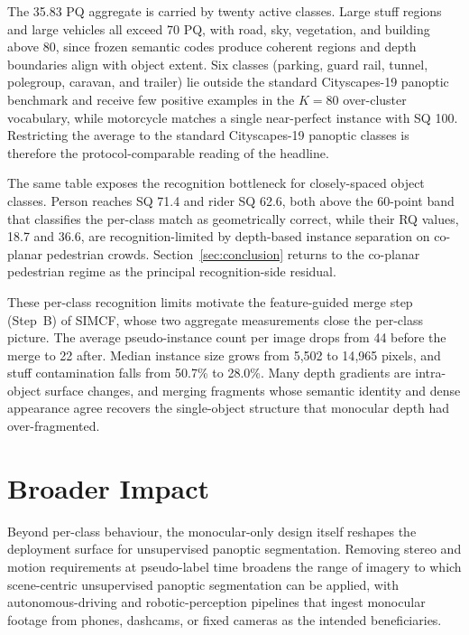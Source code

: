 \documentclass{article}
\begin{document}
The 35.83 PQ aggregate is carried by twenty active classes. Large stuff regions and large vehicles all exceed 70 PQ, with road, sky, vegetation, and building above 80, since frozen semantic codes produce coherent regions and depth boundaries align with object extent. Six classes (parking, guard rail, tunnel, polegroup, caravan, and trailer) lie outside the standard Cityscapes-19 panoptic benchmark and receive few positive examples in the $K{=}80$ over-cluster vocabulary, while motorcycle matches a single near-perfect instance with SQ 100. Restricting the average to the standard Cityscapes-19 panoptic classes is therefore the protocol-comparable reading of the headline.

The same table exposes the recognition bottleneck for closely-spaced object classes. Person reaches SQ 71.4 and rider SQ 62.6, both above the 60-point band that classifies the per-class match as geometrically correct, while their RQ values, 18.7 and 36.6, are recognition-limited by depth-based instance separation on co-planar pedestrian crowds. Section~\ref{sec:conclusion} returns to the co-planar pedestrian regime as the principal recognition-side residual.

These per-class recognition limits motivate the feature-guided merge step (Step~B) of SIMCF, whose two aggregate measurements close the per-class picture. The average pseudo-instance count per image drops from 44 before the merge to 22 after. Median instance size grows from 5{,}502 to 14{,}965 pixels, and stuff contamination falls from 50.7\% to 28.0\%. Many depth gradients are intra-object surface changes, and merging fragments whose semantic identity and dense appearance agree recovers the single-object structure that monocular depth had over-fragmented.

\section{Broader Impact}
\label{sec:impact}

\noindent Beyond per-class behaviour, the monocular-only design itself reshapes the deployment surface for unsupervised panoptic segmentation. Removing stereo and motion requirements at pseudo-label time broadens the range of imagery to which scene-centric unsupervised panoptic segmentation can be applied, with autonomous-driving and robotic-perception pipelines that ingest monocular footage from phones, dashcams, or fixed cameras as the intended beneficiaries.
\end{document}
